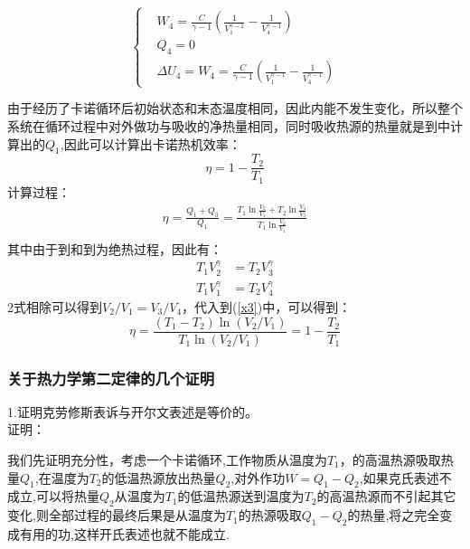 \documentclass[12pt]{article}
\begin{document}
\begin{equation}
	\left \{
	\begin{split}
		&W_4=\frac{C}{\gamma-1}(\frac{1}{V_1^{\gamma-1}}-\frac{1}{V_4^{\gamma-1}}) \\
		&Q_4=0\\
		&\Delta U_4=W_4=\frac{C}{\gamma-1}(\frac{1}{V_1^{\gamma-1}}-\frac{1}{V_4^{\gamma-1}})
	\end{split}\right.
\end{equation}
\par
由于经历了卡诺循环后初始状态和末态温度相同，因此内能不发生变化，所以整个系统在循环过程中对外做功与吸收的净热量相同，同时吸收热源的热量就是\uppercase\expandafter{}到\uppercase\expandafter{}中计算出的$Q_1$,因此可以计算出卡诺热机效率：
\begin{equation}
	\eta=1-\frac{T_2}{T_1}
\end{equation}
计算过程：
\begin{equation}
	\begin{split}
	\eta=\frac{Q_1+Q_3}{Q_1}=\frac{T_1\ln \frac{V_2}{V_1}+T_2\ln \frac{V_4}{V_3}}{T_1\ln \frac{V_2}{V_1}}\\
	\label{x3}
\end{split}
\end{equation}
其中由于\uppercase\expandafter{}到\uppercase\expandafter{}和\uppercase\expandafter{}到\uppercase\expandafter{}为绝热过程，因此有：
\begin{equation}
	\begin{split}
		T_1V_2^\gamma&=T_2V_3^\gamma \\ T_1V_1^\gamma&=T_2V_4^\gamma
	\end{split}
\end{equation}
2式相除可以得到$V_2/V_1=V_3/V_4$，代入到(\ref{x3})中，可以得到：
\begin{equation}
	\eta=\frac{(T_1-T_2)\ln (V_2/V_1)}{T_1 \ln(V_2/V_1)}=1-\frac{T_2}{T_1}
\end{equation}
\subsubsection{关于热力学第二定律的几个证明}
\noindent
1.证明克劳修斯表诉与开尔文表述是等价的。\\
证明：

我们先证明充分性，考虑一个卡诺循环,工作物质从温度为$T_1$，的高温热源吸取热量$Q_1$,在温度为$T_2$的低温热源放出热量$Q_2$,对外作功$W=Q_1-Q_2$,如果克氏表述不成立,可以将热量$Q_2$从温度为$T_1$的低温热源送到温度为$T_2$的高温热源而不引起其它变化,则全部过程的最终后果是从温度为$T_1$的热源吸取$Q_1-Q_2$的热量,将之完全变成有用的功,这样开氏表述也就不能成立.
\end{document}
